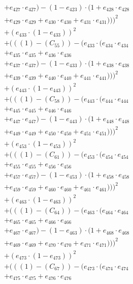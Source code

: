 \documentclass[10pt, a4paper]{article}
\begin{document}
\begin{align*}
& + e_{427} \cdot e_{427}) - (1 - e_{423}) \cdot (1 + e_{428} \cdot e_{428} \\
& + e_{429} \cdot e_{429} + e_{430} \cdot e_{430} + e_{431} \cdot e_{431})))^{2} \\
& + (e_{433} \cdot (1 - e_{433}))^{2} \\
& + (((1) - (C_{55})) - (e_{433} \cdot (e_{434} \cdot e_{434} \\
& + e_{435} \cdot e_{435} + e_{436} \cdot e_{436} \\
& + e_{437} \cdot e_{437}) - (1 - e_{433}) \cdot (1 + e_{438} \cdot e_{438} \\
& + e_{439} \cdot e_{439} + e_{440} \cdot e_{440} + e_{441} \cdot e_{441})))^{2} \\
& + (e_{443} \cdot (1 - e_{443}))^{2} \\
& + (((1) - (C_{58})) - (e_{443} \cdot (e_{444} \cdot e_{444} \\
& + e_{445} \cdot e_{445} + e_{446} \cdot e_{446} \\
& + e_{447} \cdot e_{447}) - (1 - e_{443}) \cdot (1 + e_{448} \cdot e_{448} \\
& + e_{449} \cdot e_{449} + e_{450} \cdot e_{450} + e_{451} \cdot e_{451})))^{2} \\
& + (e_{453} \cdot (1 - e_{453}))^{2} \\
& + (((1) - (C_{61})) - (e_{453} \cdot (e_{454} \cdot e_{454} \\
& + e_{455} \cdot e_{455} + e_{456} \cdot e_{456} \\
& + e_{457} \cdot e_{457}) - (1 - e_{453}) \cdot (1 + e_{458} \cdot e_{458} \\
& + e_{459} \cdot e_{459} + e_{460} \cdot e_{460} + e_{461} \cdot e_{461})))^{2} \\
& + (e_{463} \cdot (1 - e_{463}))^{2} \\
& + (((1) - (C_{64})) - (e_{463} \cdot (e_{464} \cdot e_{464} \\
& + e_{465} \cdot e_{465} + e_{466} \cdot e_{466} \\
& + e_{467} \cdot e_{467}) - (1 - e_{463}) \cdot (1 + e_{468} \cdot e_{468} \\
& + e_{469} \cdot e_{469} + e_{470} \cdot e_{470} + e_{471} \cdot e_{471})))^{2} \\
& + (e_{473} \cdot (1 - e_{473}))^{2} \\
& + (((1) - (C_{67})) - (e_{473} \cdot (e_{474} \cdot e_{474} \\
& + e_{475} \cdot e_{475} + e_{476} \cdot e_{476} \\

\end{align*}
\end{document}
